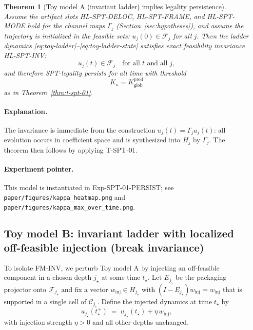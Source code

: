 \documentclass[11pt]{article}
\newtheorem{theorem}[definition]{Theorem}
\begin{document}
\begin{theorem}[Toy model A (invariant ladder) implies legality persistence]\label{thm:toy-ladder-invariant}
Assume the artifact slots HL-SPT-DELOC, HL-SPT-FRAME, and HL-SPT-MODE hold for the channel maps $\Gamma_j$ (Section~\ref{sec:hypotheses}), and assume the trajectory is initialized in the feasible sets: $u_j(0)\in\mathcal{F}_j$ for all $j$.
Then the ladder dynamics \eqref{eq:toy-ladder}--\eqref{eq:toy-ladder-state} satisfies exact feasibility invariance HL-SPT-INV:
\[
u_j(t)\in\mathcal{F}_j \quad \text{for all } t \text{ and all } j,
\]
and therefore SPT-legality persists for all time with threshold
\[
K_\kappa = K^{\mathrm{pred}}_{\mathrm{glob}}
\]
as in Theorem~\ref{thm:t-spt-01}.
\end{theorem}

\paragraph{Explanation.}
The invariance is immediate from the construction $u_j(t)=\Gamma_j a_j(t)$: all evolution occurs in coefficient space and is synthesized into $H_j$ by $\Gamma_j$.
The theorem then follows by applying T-SPT-01.

\paragraph{Experiment pointer.}
This model is instantiated in Exp-SPT-01-PERSIST; see \nolinkurl{paper/figures/kappa_heatmap.png} and \nolinkurl{paper/figures/kappa_max_over_time.png}.

\subsection{Toy model B: invariant ladder with localized off-feasible injection (break invariance)}

To isolate FM-INV, we perturb Toy model A by injecting an off-feasible component in a chosen depth $j_\star$ at some time $t_\star$.
Let $E_{j_\star}$ be the packaging projector onto $\mathcal{F}_{j_\star}$ and fix a vector $w_{\mathrm{inj}}\in H_{j_\star}$ with $(I-E_{j_\star})w_{\mathrm{inj}}=w_{\mathrm{inj}}$ that is supported in a single cell of $\mathcal{C}_{j_\star}$.
Define the injected dynamics at time $t_\star$ by
\begin{equation}\label{eq:toy-inj}
u_{j_\star}(t_\star^+) \;=\; u_{j_\star}(t_\star) + \eta\,w_{\mathrm{inj}},
\end{equation}
with injection strength $\eta>0$ and all other depths unchanged.
\end{document}
